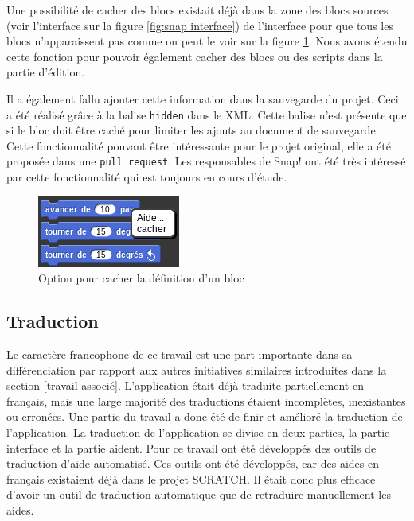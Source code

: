 Une possibilité de cacher des blocs existait déjà dans la zone des blocs sources (voir l'interface sur la figure \ref{fig:snap interface}) de l'interface pour que tous les blocs n'apparaissent pas comme on peut le voir sur la figure \ref{fig:cacher}. Nous avons étendu cette fonction pour pouvoir également cacher des blocs ou des scripts dans la partie d'édition.

Il a également fallu ajouter cette information dans la sauvegarde du projet. Ceci a été réalisé grâce à la balise \texttt{hidden} dans le XML. Cette balise n'est présente que si le bloc doit être caché pour limiter les ajouts au document de sauvegarde.\\

Cette fonctionnalité pouvant être intéressante pour le projet original, elle a été proposée dans une \texttt{pull request}. Les responsables de Snap! ont été très intéressé par cette fonctionnalité qui est toujours en cours d'étude.
\begin{figure}[ht]
  \begin{center}
    \includegraphics[scale=0.5]{content/7-solution/2-snap/images/cacher}
    \caption{Option pour cacher la définition d'un bloc}
    \label{fig:cacher}
  \end{center}
\end{figure}

\subsection{Traduction}
Le caractère francophone de ce travail est une part importante dans sa différenciation par rapport aux autres initiatives similaires introduites dans la section \ref{travail associé}. L'application était déjà traduite partiellement en français, mais une large majorité des traductions étaient incomplètes, inexistantes ou erronées. Une partie du travail a donc été de finir et amélioré la traduction de l'application. La traduction de l'application se divise en deux parties, la partie interface et la partie aident. Pour ce travail ont été développés des outils de traduction d'aide automatisé. Ces outils ont été développés, car des aides en français existaient déjà dans le projet SCRATCH. Il était donc plus efficace d'avoir un outil de traduction automatique que de retraduire manuellement les aides.


